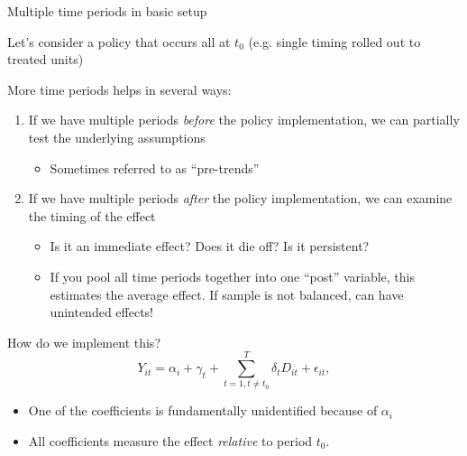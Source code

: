 \documentclass[notes,11pt, aspectratio=169]{beamer}
\newenvironment{wideitemize}{\itemize\addtolength{\itemsep}{10pt}}{\enditemize}
\begin{document}
\begin{frame}{Multiple time periods in basic setup}
  \begin{wideitemize}
  \item Let's consider a policy that occurs all at $t_{0}$
    (e.g. single timing rolled out to treated units)
  \item  More time periods helps in several ways:
    \begin{enumerate}
    \item If we have multiple periods \emph{before} the policy implementation, we can partially test the underlying assumptions
      \begin{itemize}
      \item Sometimes referred to as ``pre-trends''
      \end{itemize}
    \item If we have multiple periods \emph{after} the policy implementation, we can examine the timing of the effect
      \begin{itemize}
      \item Is it an immediate effect? Does it die off? Is it persistent?
      \item If you pool all time periods together into one ``post'' variable, this estimates the average effect. If sample is not balanced, can have unintended effects!
      \end{itemize}
    \end{enumerate}
  \item  How do we implement this? 
    \begin{equation*}
      Y_{it} = \alpha_{i} + \gamma_{t} + \sum_{t=1, t\not=t_{0}}^{T}\delta_{t} D_{it} + \epsilon_{it},
    \end{equation*}
    \begin{itemize}
    \item One of the coefficients is fundamentally unidentified
      because of $\alpha_{i}$
    \item All coefficients measure the effect \emph{relative} to period $t_{0}$.
      \end{itemize}
  \end{wideitemize}
\end{frame}
\end{document}
